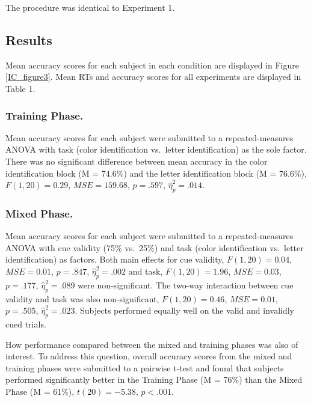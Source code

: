 \documentclass[]{DissertateCUNY}
\begin{document}
The procedure was identical to Experiment 1.

\hypertarget{results-1}{%
\subsection{Results}\label{results-1}}

Mean accuracy scores for each subject in each condition are displayed in
Figure \ref{IC_figure3}. Mean RTs and accuracy scores for all
experiments are displayed in Table 1.

\hypertarget{training-phase.}{%
\subsubsection{Training Phase.}\label{training-phase.}}

Mean accuracy scores for each subject were submitted to a
repeated-measures ANOVA with task (color identification vs.~letter
identification) as the sole factor. There was no significant difference
between mean accuracy in the color identification block (M = 74.6\%) and
the letter identification block (M = 76.6\%), \(F(1, 20) = 0.29\),
\(\mathit{MSE} = 159.68\), \(p = .597\), \(\hat{\eta}^2_p = .014\).

\hypertarget{mixed-phase.}{%
\subsubsection{Mixed Phase.}\label{mixed-phase.}}

Mean accuracy scores for each subject were submitted to a
repeated-measures ANOVA with cue validity (75\% vs.~25\%) and task
(color identification vs.~letter identification) as factors. Both main
effects for cue validity, \(F(1, 20) = 0.04\), \(\mathit{MSE} = 0.01\),
\(p = .847\), \(\hat{\eta}^2_p = .002\) and task, \(F(1, 20) = 1.96\),
\(\mathit{MSE} = 0.03\), \(p = .177\), \(\hat{\eta}^2_p = .089\) were
non-significant. The two-way interaction between cue validity and task
was also non-significant, \(F(1, 20) = 0.46\), \(\mathit{MSE} = 0.01\),
\(p = .505\), \(\hat{\eta}^2_p = .023\). Subjects performed equally well
on the valid and invalidly cued trials.

How performance compared between the mixed and training phases was also
of interest. To address this question, overall accuracy scores from the
mixed and training phases were submitted to a pairwise t-test and found
that subjects performed significantly better in the Training Phase (M =
76\%) than the Mixed Phase (M = 61\%), \(t(20) = -5.38\), \(p < .001\).
\end{document}
